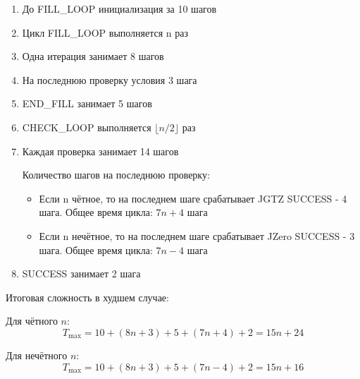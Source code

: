 \documentclass[12pt]{article}
\begin{document}
\begin{enumerate}
    \item До FILL\_LOOP инициализация за 10 шагов
    \item Цикл FILL\_LOOP выполняется n раз
    \item Одна итерация занимает 8 шагов
    \item На последнюю проверку условия 3 шага
    \item END\_FILL занимает 5 шагов
    \item CHECK\_LOOP выполняется $\lfloor n/2 \rfloor$ раз
    \item Каждая проверка занимает 14 шагов
    
    Количество шагов на последнюю проверку:
    \begin{itemize}
        \item Если n чётное, то на последнем шаге срабатывает JGTZ SUCCESS - 4 шага. Общее время цикла: $7n + 4$ шага
        \item Если n нечётное, то на последнем шаге срабатывает JZero SUCCESS - 3 шага. Общее время цикла: $7n - 4$ шага
    \end{itemize}
    
    \item SUCCESS занимает 2 шага
\end{enumerate}

Итоговая сложность в худшем случае:

Для чётного \(n\):
\[
    T_{\max} = 10 + (8n + 3) + 5 + (7n + 4) + 2 = 15n + 24
\]

Для нечётного \(n\):
\[
    T_{\max} = 10 + (8n + 3) + 5 + (7n - 4) + 2 = 15n + 16
\]
\end{document}
